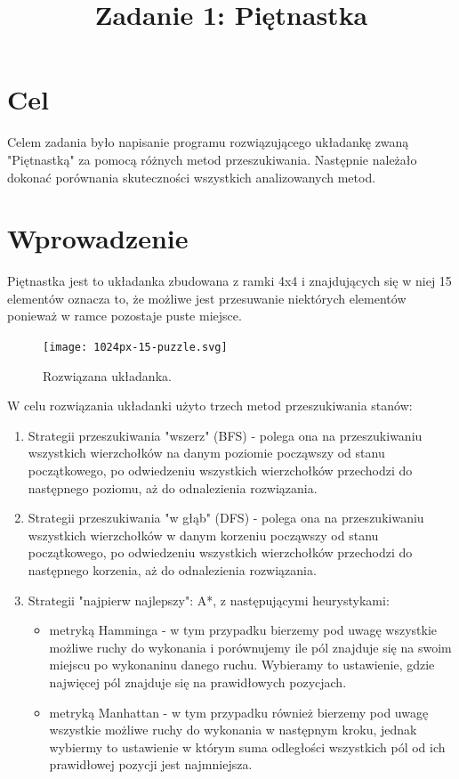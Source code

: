 \documentclass{classrep}
\author{
  \studentinfo{Paweł Białek}{216723} \and
  \studentinfo{Łukasz Kostrzewa}{216804}
}
\title{Zadanie 1: Piętnastka}
\begin{document}
\maketitle


\section{Cel}
{\color{black}
Celem zadania było napisanie programu rozwiązującego układankę zwaną "Piętnastką" za pomocą różnych metod przeszukiwania. Następnie należało dokonać porównania
skuteczności wszystkich analizowanych metod.}

\section{Wprowadzenie}
{\color{black}
Piętnastka jest to układanka zbudowana z ramki 4x4  i znajdujących się w niej 15 elementów oznacza to, że możliwe jest przesuwanie niektórych elementów ponieważ w ramce pozostaje puste miejsce.
\begin{figure}
\centering
\texttt{[image: 1024px-15-puzzle.svg]}
\caption{Rozwiązana układanka.}
\end{figure}
\newpage
W celu rozwiązania układanki użyto trzech metod przeszukiwania stanów:
\begin{enumerate}
\item Strategii przeszukiwania "wszerz" (BFS) - polega ona na przeszukiwaniu wszystkich wierzchołków na danym poziomie począwszy od stanu początkowego, po odwiedzeniu wszystkich wierzchołków przechodzi do następnego poziomu, aż do odnalezienia rozwiązania.
\item Strategii przeszukiwania "w głąb" (DFS) - polega ona na przeszukiwaniu wszystkich wierzchołków w danym korzeniu począwszy od stanu początkowego, po odwiedzeniu wszystkich wierzchołków przechodzi do następnego korzenia, aż do odnalezienia rozwiązania. 
\item Strategii "najpierw najlepszy": A*, z następującymi heurystykami: 
\begin{itemize}
\item metryką Hamminga - w tym przypadku bierzemy pod uwagę wszystkie możliwe ruchy do wykonania i porównujemy ile pól znajduje się na swoim miejscu po wykonaninu danego ruchu. Wybieramy to ustawienie, gdzie najwięcej pól znajduje się na prawidłowych pozycjach.
\item metryką Manhattan - w tym przypadku również bierzemy pod uwagę wszystkie możliwe ruchy do wykonania w następnym kroku, jednak wybiermy to ustawienie w którym suma odległości wszystkich pól od ich prawidłowej pozycji jest najmniejsza.
\end{itemize}
\end{enumerate}}
\end{document}
